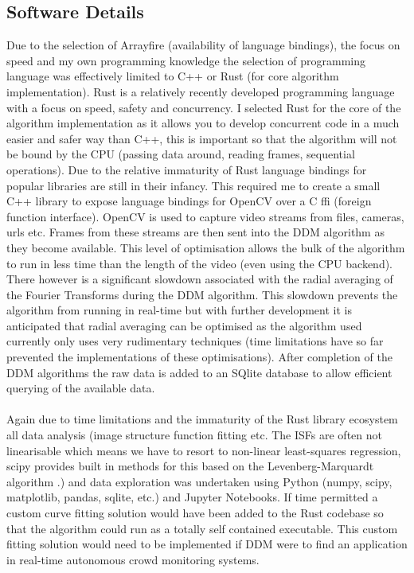 \documentclass[10pt]{article}
\begin{document}
\subsection{Software Details}
Due to the selection of Arrayfire (availability of language bindings), the focus on speed and my own programming knowledge the selection of programming language was effectively limited to C++ or Rust \cite{rust} (for core algorithm implementation). Rust is a relatively recently developed programming language with a focus on speed, safety and concurrency. I selected Rust for the core of the algorithm implementation as it allows you to develop concurrent code in a much easier and safer way than C++, this is important so that the algorithm will not be bound by the CPU (passing data around, reading frames, sequential operations). Due to the relative immaturity of Rust language bindings for popular libraries are still in their infancy. This required me to create a small C++ library to expose language bindings for OpenCV over a C ffi (foreign function interface). OpenCV is used to capture video streams from files, cameras, urls etc. Frames from these streams are then sent into the DDM algorithm as they become available. This level of optimisation allows the bulk of the algorithm to run in less time than the length of the video (even using the CPU backend). There however is a significant slowdown associated with the radial averaging of the Fourier Transforms during the DDM algorithm. This slowdown prevents the algorithm from running in real-time but with further development it is anticipated that radial averaging can be optimised as the algorithm used currently only uses very rudimentary techniques (time limitations have so far prevented the implementations of these optimisations). After completion of the DDM algorithms the raw data is added to an SQlite database to allow efficient querying of the available data.
\\\\
Again due to time limitations and the immaturity of the Rust library ecosystem all data analysis (image structure function fitting etc. The ISFs are often not linearisable which means we have to resort to non-linear least-squares regression, scipy provides built in methods for this based on the Levenberg-Marquardt algorithm \cite{scipy_fit}.) and data exploration was undertaken using Python (numpy, scipy, matplotlib, pandas, sqlite, etc.) and Jupyter Notebooks. If time permitted a custom curve fitting solution would have been added to the Rust codebase so that the algorithm could run as a totally self contained executable. This custom fitting solution would need to be implemented if DDM were to find an application in real-time autonomous crowd monitoring systems.
\end{document}
